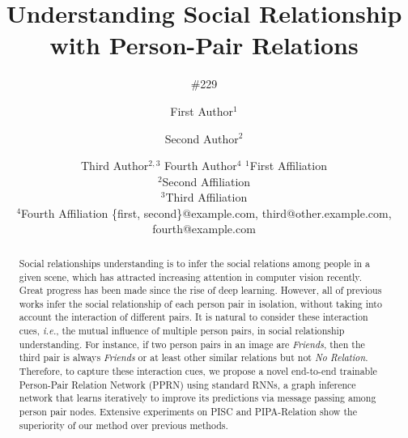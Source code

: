 \documentclass{article}
\title{Understanding Social Relationship with Person-Pair Relations}
\author{
    \#229
}
\author{
First Author$^1$
\and
Second Author$^2$\and
Third Author$^{2,3}$\And
Fourth Author$^4$
\affiliations
$^1$First Affiliation\\
$^2$Second Affiliation\\
$^3$Third Affiliation\\
$^4$Fourth Affiliation
\emails
\{first, second\}@example.com,
third@other.example.com,
fourth@example.com
}
\newcommand{\PPRN}{{\sf PPRN}}
\begin{document}
\maketitle

\begin{abstract}
Social relationships understanding is to infer the social relations among people in a given scene, which has attracted increasing attention in computer vision recently. Great progress has been made since the rise of deep learning. However, all of previous works infer the social relationship of each person pair in isolation, without taking into account the interaction of different pairs. It is natural to consider these interaction cues, {\it i.e.}, the mutual influence of multiple person pairs, in social relationship understanding. For instance, if two person pairs in an image are {\it Friends}, then the third pair is always {\it Friends} or at least other similar relations but not {\it No Relation}. Therefore, to capture these interaction cues, we propose a novel end-to-end trainable Person-Pair Relation Network (\PPRN) using standard RNNs, a graph inference network that learns iteratively to improve its predictions via message passing among person pair nodes. Extensive experiments on PISC and PIPA-Relation show the superiority of our method over previous methods.


\end{abstract}
\end{document}
